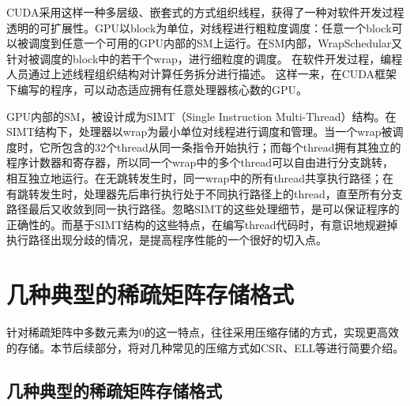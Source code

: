 \documentclass[11pt,twocolumn]{article}
\begin{document}
CUDA采用这样一种多层级、嵌套式的方式组织线程，获得了一种对软件开发过程透明的可扩展性。GPU以block为单位，对线程进行粗粒度调度：任意一个block可以被调度到任意一个可用的GPU内部的SM上运行。在SM内部，WrapSchedular又针对被调度的block中的若干个wrap，进行细粒度的调度。
在软件开发过程，编程人员通过上述线程组织结构对计算任务拆分进行描述。
这样一来，在CUDA框架下编写的程序，可以动态适应拥有任意处理器核心数的GPU。

GPU内部的SM，被设计成为SIMT（Single Instruction Multi-Thread）结构。在SIMT结构下，处理器以wrap为最小单位对线程进行调度和管理。当一个wrap被调度时，它所包含的32个thread从同一条指令开始执行；而每个thread拥有其独立的程序计数器和寄存器，所以同一个wrap中的多个thread可以自由进行分支跳转，相互独立地运行。在无跳转发生时，同一wrap中的所有thread共享执行路径；在有跳转发生时，处理器先后串行执行处于不同执行路径上的thread，直至所有分支路径最后又收敛到同一执行路径。忽略SIMT的这些处理细节，是可以保证程序的正确性的。而基于SIMT结构的这些特点，在编写thread代码时，有意识地规避掉执行路径出现分歧的情况，是提高程序性能的一个很好的切入点。


\section{几种典型的稀疏矩阵存储格式}
针对稀疏矩阵中多数元素为0的这一特点，往往采用压缩存储的方式，实现更高效的存储。本节后续部分，将对几种常见的压缩方式如CSR、ELL等进行简要介绍\cite{Bell:SpMV:NVIDIA:2008}。
\subsection{几种典型的稀疏矩阵存储格式}
\end{document}
